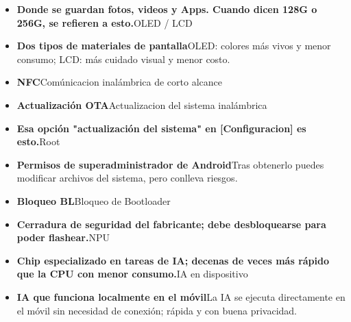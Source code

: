 

\begin{itemize}
  \item \textbf{Donde se guardan fotos, videos y Apps. Cuando dicen 128G o 256G, se refieren a esto.}OLED / LCD
  \item \textbf{Dos tipos de materiales de pantalla}OLED: colores más vivos y menor consumo; LCD: más cuidado visual y menor costo.
  \item \textbf{NFC}Comúnicacion inalámbrica de corto alcance
\end{itemize}


\begin{itemize}
  \item \textbf{Actualización OTA}Actualizacion del sistema inalámbrica
  \item \textbf{Esa opción "actualización del sistema" en [Configuracion] es esto.}Root
  \item \textbf{Permisos de superadministrador de Android}Tras obtenerlo puedes modificar archivos del sistema, pero conlleva riesgos.
  \item \textbf{Bloqueo BL}Bloqueo de Bootloader
  \item \textbf{Cerradura de seguridad del fabricante; debe desbloquearse para poder flashear.}NPU
\end{itemize}


\begin{itemize}
  \item \textbf{Chip especializado en tareas de IA; decenas de veces más rápido que la CPU con menor consumo.}IA en dispositivo
  \item \textbf{IA que funciona localmente en el móvil}La IA se ejecuta directamente en el móvil sin necesidad de conexión; rápida y con buena privacidad.
\end{itemize}
